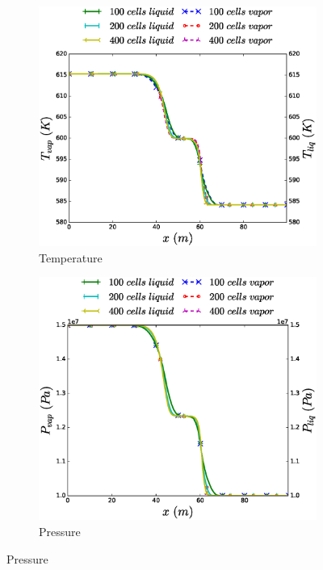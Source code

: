 \documentclass{inputs/mc2015}
\begin{document}
\begin{figure}[H]
        \begin{subfigure}[b]{0.49\textwidth}
                \centering
                \includegraphics[width=\textwidth]{figures/two-phase-shock-tube-hem-temperature-plot.eps}              
                \caption{Temperature}
                \label{fig:2p-shock-tube-plots-temp-hem-sa}
        \end{subfigure}
        \vspace{-1 mm}
        \centering
        \begin{subfigure}[b]{0.49\textwidth}
                \centering
                \includegraphics[width=\textwidth]{figures/two-phase-shock-tube-hem-pressure-plot.eps}                
                \caption{Pressure}
                \label{fig:2p-shock-tube-plots-press-hem-sa}
        \end{subfigure}%


\end{figure}
\end{document}
